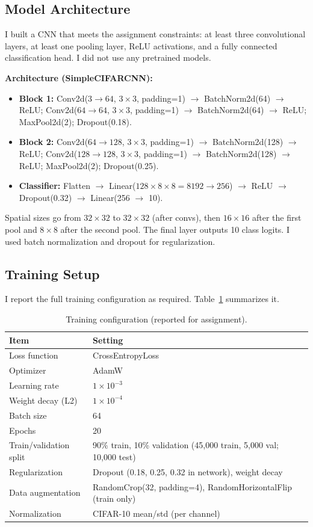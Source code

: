 \documentclass[11pt]{article}
\begin{document}
\subsection{Model Architecture}

I built a CNN that meets the assignment constraints: at least three convolutional layers, at least one pooling layer, ReLU activations, and a fully connected classification head. I did not use any pretrained models.

\textbf{Architecture (SimpleCIFARCNN):}
\begin{itemize}[noitemsep]
    \item \textbf{Block 1:} Conv2d($3 \to 64$, $3\times3$, padding=1) $\to$ BatchNorm2d(64) $\to$ ReLU; Conv2d($64 \to 64$, $3\times3$, padding=1) $\to$ BatchNorm2d(64) $\to$ ReLU; MaxPool2d(2); Dropout(0.18).
    \item \textbf{Block 2:} Conv2d($64 \to 128$, $3\times3$, padding=1) $\to$ BatchNorm2d(128) $\to$ ReLU; Conv2d($128 \to 128$, $3\times3$, padding=1) $\to$ BatchNorm2d(128) $\to$ ReLU; MaxPool2d(2); Dropout(0.25).
    \item \textbf{Classifier:} Flatten $\to$ Linear($128\times8\times8 = 8192 \to 256$) $\to$ ReLU $\to$ Dropout(0.32) $\to$ Linear(256 $\to$ 10).
\end{itemize}

Spatial sizes go from $32\times32$ to $32\times32$ (after convs), then $16\times16$ after the first pool and $8\times8$ after the second pool. The final layer outputs 10 class logits. I used batch normalization and dropout for regularization.

\subsection{Training Setup}

I report the full training configuration as required. Table~\ref{tab:setup} summarizes it.

\begin{table}[htbp]
\centering
\caption{Training configuration (reported for assignment).}
\label{tab:setup}
\begin{tabular}{ll}
\toprule
\textbf{Item} & \textbf{Setting} \\
\midrule
Loss function & CrossEntropyLoss \\
Optimizer & AdamW \\
Learning rate & $1\times10^{-3}$ \\
Weight decay (L2) & $1\times10^{-4}$ \\
Batch size & 64 \\
Epochs & 20 \\
Train/validation split & 90\% train, 10\% validation (45,000 train, 5,000 val; 10,000 test) \\
Regularization & Dropout (0.18, 0.25, 0.32 in network), weight decay \\
Data augmentation & RandomCrop(32, padding=4), RandomHorizontalFlip (train only) \\
Normalization & CIFAR-10 mean/std (per channel) \\
\bottomrule
\end{tabular}
\end{table}
\end{document}
